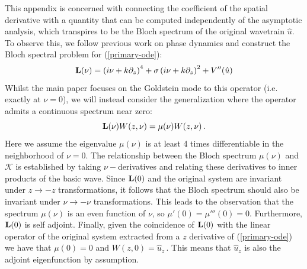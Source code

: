 \documentclass[10pt]{article}
\begin{document}
\begin{appendix}
This appendix is concerned with connecting the coefficient of the spatial
derivative with a quantity that can be computed independently of the asymptotic
analysis, which transpires to be the Bloch spectrum of the original wavetrain
$\hat{u}$. To observe this, we follow previous work on phase dynamics
\cite{doelman2009dynamics,ratliff2021} and construct the Bloch spectral problem
for (\ref{primary-ode}):
%
\begin{equation}
    {\bf L}(\nu) = \left(i\nu+k\partial _z\right)^4+\sigma \left(i \nu+k\partial _z\right)^2+V''(\hat{u})
\end{equation}
%
Whilst the main paper focuses on the Goldstein mode to this operator (i.e.
exactly at $\nu = 0$), we will instead consider the generalization where the
operator admits a continuous spectrum near zero:
%
\begin{equation}\label{eqn:eigen-problem}
{\bf L}(\nu) W(z,\nu) = \mu(\nu)W(z,\nu)\,.
\end{equation}
%
Here we assume the eigenvalue $\mu(\nu)$ is at least 4 times differentiable in the neighborhood of
$\nu=0$. The relationship between the Bloch spectrum $\mu(\nu)$ and
$\mathscr{K}$ is established by taking $\nu-$derivatives and relating these derivatives to inner products of the basic
wave. Since ${\bf L}(0)$ and the original system are invariant under $z\to-z$
transformations, it follows that the Bloch spectrum should also be invariant
under $\nu \to -\nu$ transformations. This leads to the observation that the
spectrum $\mu(\nu)$ is an even function of $\nu$, so $\mu'(0) = \mu '''(0) = 0$.
Furthermore, ${\bf L}(0)$ is self adjoint. Finally, given the coincidence of
${\bf L}(0)$ with the linear operator of the original system extracted from a
$z$ derivative of (\ref{primary-ode}) we have  that $\mu(0) = 0$ and $W(z,0) =
\hat{u}_z\,.$ This means that $\hat{u}_z$ is also the adjoint eigenfunction by
assumption.


\end{appendix}
\end{document}
